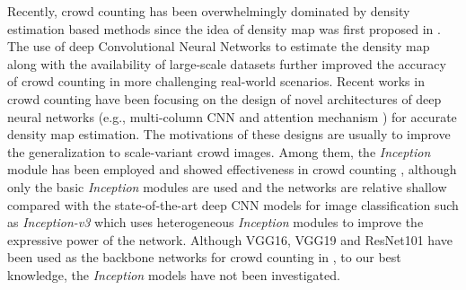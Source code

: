 \documentclass[journal,comsoc]{IEEEtran}
\begin{document}
Recently, crowd counting has been overwhelmingly dominated by density estimation based methods since the idea of density map was first proposed in \cite{lempitsky2010learning}. The use of deep Convolutional Neural Networks \cite{krizhevsky2012imagenet} to estimate the density map along with the availability of large-scale datasets \cite{zhang2016single,idrees2018composition} further improved the accuracy of crowd counting in more challenging real-world scenarios. Recent works in crowd counting have been focusing on the design of novel architectures of deep neural networks (e.g., multi-column CNN \cite{zhang2016single,sindagi2017generating} and attention mechanism \cite{liu2018decidenet,zhang2018attention}) for accurate density map estimation. The motivations of these designs are usually to improve the generalization to scale-variant crowd images. Among them, the \textit{Inception} module \cite{szegedy2016rethinking} has been employed and showed effectiveness in crowd counting \cite{cao2018scale,jiang2019crowd}, although only the basic \textit{Inception} modules are used and the networks are relative shallow compared with the state-of-the-art deep CNN models for image classification such as \textit{Inception-v3} \cite{szegedy2016rethinking} which uses heterogeneous \textit{Inception} modules to improve the expressive power of the network. Although VGG16, VGG19 and ResNet101 have been used as the backbone networks for crowd counting in \cite{guo2019dadnet,ma2019bayesian,wang2019learning}, to our best knowledge, the  \textit{Inception}  models have not been investigated.
\end{document}
